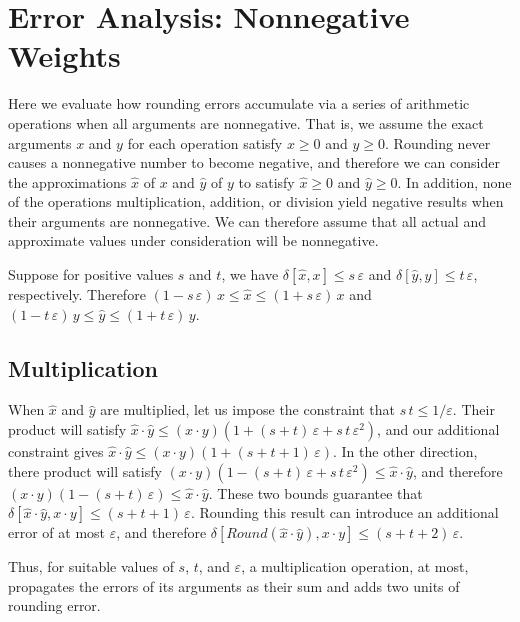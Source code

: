 \documentclass[letterpaper,USenglish,cleveref, autoref, thm-restate]{lipics-v2021}
\newcommand{\approximate}[1]{\hat{#1}}
\newcommand{\approxx}{\approximate{x}}
\newcommand{\approxy}{\approximate{y}}
\newcommand{\round}{\mathit{Round}}
\newcommand{\aerror}{\delta}
\newcommand{\roundepsilon}{\varepsilon}
\begin{document}
\section{Error Analysis: Nonnegative Weights}
\label{sect:nonneg}

Here we evaluate how rounding errors accumulate via a series of
arithmetic operations when all arguments are nonnegative.
That is, we assume the exact arguments $x$ and $y$ for each operation satisfy $x \geq 0$ and $y \geq 0$.
Rounding never causes a nonnegative number to become negative, and therefore we can
consider the approximations $\approxx$ of  $x$ and $\approxy$ of $y$ to satisfy $\approxx \geq 0$ and $\approxy \geq 0$.
In addition, none of the operations multiplication, addition, or division yield negative results when their arguments are nonnegative.
We can therefore
assume that all actual and approximate values under consideration will
be nonnegative.

Suppose for positive values $s$ and $t$, we have
$\aerror[\approxx, x] \leq s\, \roundepsilon$ and
$\aerror[\approxy, y] \leq t\, \roundepsilon$, respectively.
Therefore
$(1-s\,\roundepsilon)\, x \leq \approxx \leq (1+s\,\roundepsilon)\, x$ and
$(1-t\,\roundepsilon)\, y \leq \approxy \leq (1+t\,\roundepsilon)\, y$.


\subsection{Multiplication}

When $\approxx$ and $\approxy$ are multiplied, let us impose the constraint that $s\,t \leq 1/\roundepsilon$.
Their product will satisfy
$\approxx \cdot \approxy \leq (x\cdot y) (1 + (s+t)\,\roundepsilon + s\,t\,\roundepsilon^2)$, and our additional constraint gives
$\approxx \cdot \approxy \leq (x\cdot y) (1 + (s+t+1)\,\roundepsilon)$.
In the other direction, there product will satisfy
$(x\cdot y) (1 - (s+t)\,\roundepsilon + s\,t\,\roundepsilon^2) \leq \approxx \cdot \approxy$, and therefore
$(x\cdot y) (1 - (s+t)\,\roundepsilon) \leq \approxx \cdot \approxy$.  These two bounds guarantee that
$\aerror[\approxx \cdot \approxy, x \cdot y] \leq (s+t+1)\,\roundepsilon$.
Rounding this result can introduce an additional error of at most $\roundepsilon$, and therefore
$\aerror[\round(\approxx \cdot \approxy), x \cdot y] \leq (s+t+2)\,\roundepsilon$.

Thus, for suitable values of $s$, $t$, and $\roundepsilon$,
a multiplication operation, at most, propagates the errors of its arguments as their sum and adds two units of rounding error.
\end{document}
